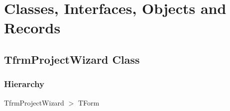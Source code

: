 \documentclass{report}
\newif\ifpdf
\begin{document}
\section{Classes, Interfaces, Objects and Records}
\ifpdf
\subsection*{\large{\textbf{TfrmProjectWizard Class}}\normalsize\hspace{1ex}\hrulefill}
\else
\subsection*{TfrmProjectWizard Class}
\fi
\label{prjwizard.TfrmProjectWizard}
\subsubsection*{\large{\textbf{Hierarchy}}\normalsize\hspace{1ex}\hfill}
TfrmProjectWizard {$>$} TForm
\end{document}
